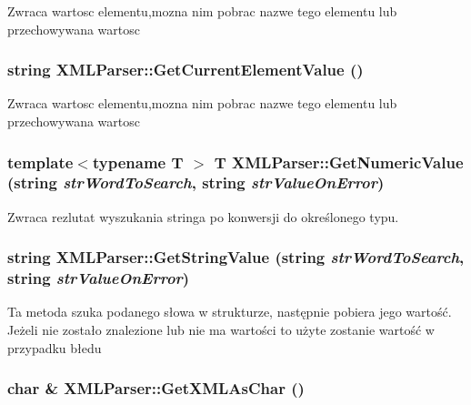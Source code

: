 Zwraca wartosc elementu,mozna nim pobrac nazwe tego elementu lub przechowywana wartosc 

\hypertarget{classXMLParser_a0e2b4757fe54a8166f1e1eea31af1da3}{
\subsubsection[{GetCurrentElementValue}]{\setlength{\rightskip}{0pt plus 5cm}string XMLParser::GetCurrentElementValue ()}}
\label{classXMLParser_a0e2b4757fe54a8166f1e1eea31af1da3}


Zwraca wartosc elementu,mozna nim pobrac nazwe tego elementu lub przechowywana wartosc 

\hypertarget{classXMLParser_aa5edec062cd6333162a4c1906e55f9f0}{
\subsubsection[{GetNumericValue}]{\setlength{\rightskip}{0pt plus 5cm}template$<$typename T $>$ T XMLParser::GetNumericValue (string {\em strWordToSearch}, \/  string {\em strValueOnError})}}
\label{classXMLParser_aa5edec062cd6333162a4c1906e55f9f0}


Zwraca rezlutat wyszukania stringa po konwersji do określonego typu. 

\hypertarget{classXMLParser_a055eba0b19ffb778cb3d2e5eb958c8ab}{
\subsubsection[{GetStringValue}]{\setlength{\rightskip}{0pt plus 5cm}string XMLParser::GetStringValue (string {\em strWordToSearch}, \/  string {\em strValueOnError})}}
\label{classXMLParser_a055eba0b19ffb778cb3d2e5eb958c8ab}


Ta metoda szuka podanego słowa w strukturze, następnie pobiera jego wartość. Jeżeli nie zostało znalezione lub nie ma wartości to użyte zostanie wartość w przypadku błedu

\hypertarget{classXMLParser_a986fd0d42f960d80fbc8bbab76757600}{
\subsubsection[{GetXMLAsChar}]{\setlength{\rightskip}{0pt plus 5cm}char \& XMLParser::GetXMLAsChar ()}}
\label{classXMLParser_a986fd0d42f960d80fbc8bbab76757600}


